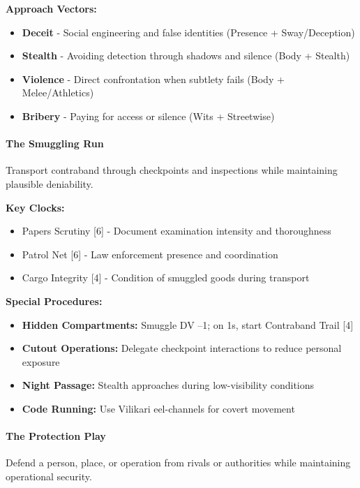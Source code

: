 \documentclass[11pt]{article}
\begin{document}
\textbf{Approach Vectors:}
\begin{itemize}
    \item \textbf{Deceit} - Social engineering and false identities (Presence + Sway/Deception)
    \item \textbf{Stealth} - Avoiding detection through shadows and silence (Body + Stealth)
    \item \textbf{Violence} - Direct confrontation when subtlety fails (Body + Melee/Athletics)  
    \item \textbf{Bribery} - Paying for access or silence (Wits + Streetwise)
\end{itemize}

\paragraph{The Smuggling Run}

Transport contraband through checkpoints and inspections while maintaining plausible deniability.

\textbf{Key Clocks:}
\begin{itemize}
    \item Papers Scrutiny [6] - Document examination intensity and thoroughness
    \item Patrol Net [6] - Law enforcement presence and coordination
    \item Cargo Integrity [4] - Condition of smuggled goods during transport
\end{itemize}

\textbf{Special Procedures:}
\begin{itemize}
    \item \textbf{Hidden Compartments:} Smuggle DV --1; on 1s, start Contraband Trail [4]
    \item \textbf{Cutout Operations:} Delegate checkpoint interactions to reduce personal exposure
    \item \textbf{Night Passage:} Stealth approaches during low-visibility conditions
    \item \textbf{Code Running:} Use Vilikari eel-channels for covert movement
\end{itemize}

\paragraph{The Protection Play}

Defend a person, place, or operation from rivals or authorities while maintaining operational security.
\end{document}
